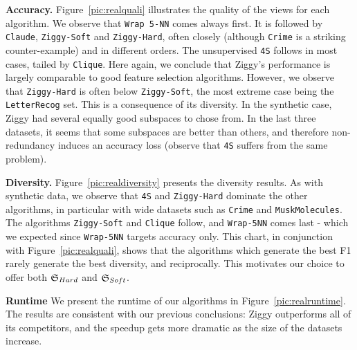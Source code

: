 \textbf{Accuracy.} Figure~\ref{pic:realquali} illustrates the quality of the
views for each algorithm. We observe that \texttt{Wrap 5-NN} comes always
first. It is followed by \texttt{Claude}, \texttt{Ziggy-Soft} and
\texttt{Ziggy-Hard}, often closely (although \texttt{Crime} is a striking
counter-example) and in different orders. The unsupervised
\texttt{4S} follows in most cases, tailed by \texttt{Clique}. Here again, we
conclude that Ziggy's performance is largely comparable to good feature
selection algorithms. However, we observe that \texttt{Ziggy-Hard} is often
below \texttt{Ziggy-Soft}, the most extreme case being the \texttt{LetterRecog}
set.  This is a consequence of its diversity. In the synthetic case, Ziggy had
several equally good subspaces to chose from. In the last three datasets, it
seems that some subspaces are better than others, and therefore non-redundancy
induces an accuracy loss (observe that \texttt{4S} suffers from the same
problem).

\textbf{Diversity.} Figure~\ref{pic:realdiversity} presents the diversity results.
As with synthetic data, we observe that \texttt{4S} and \texttt{Ziggy-Hard}
dominate the other algorithms, in particular with wide datasets such as
\texttt{Crime} and \texttt{MuskMolecules}. The algorithms \texttt{Ziggy-Soft}
and \texttt{Clique} follow, and \texttt{Wrap-5NN} comes last - which we
expected since \texttt{Wrap-5NN} targets accuracy only. This chart, in
conjunction with Figure~\ref{pic:realquali}, shows that the algorithms which
generate the best F1 rarely generate the best diversity, and reciprocally. This
motivates our choice to offer both $\mathfrak{S}_{Hard}$ and $\mathfrak{S}_{Soft}$.

\textbf{Runtime} We present the runtime of our algorithms in
Figure~\ref{pic:realruntime}. The results are consistent with our previous
conclusions: Ziggy outperforms all of its competitors, and the speedup gets more
dramatic as the size of the datasets increase.


